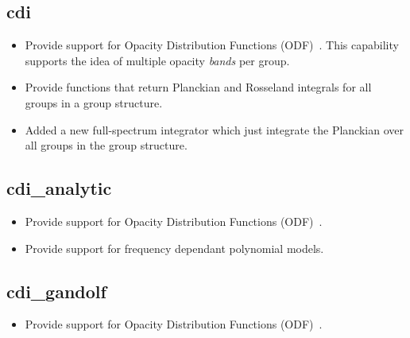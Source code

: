 \documentclass[note]{ResearchNote}
\begin{document}
\subsection{cdi}
\label{changes:cdi}
\begin{itemize}
\item Provide support for Opacity Distribution Functions
  (ODF)~\cite{ccs2:08-52}. This capability supports the idea of
  multiple opacity {\it bands} per group.  
\item Provide functions that return Planckian and Rosseland integrals
  for all groups in a group structure.
\item Added a new full-spectrum integrator which just integrate the
  Planckian over all groups in the group structure.
\end{itemize}

\subsection{cdi\_analytic}
\label{changes:cdi-analytic}
\begin{itemize}
\item Provide support for Opacity Distribution Functions
  (ODF)~\cite{ccs2:08-52}.  
\item Provide support for frequency dependant polynomial models.
\end{itemize}

\subsection{cdi\_gandolf}
\label{changes:cdi-gandolf}
\begin{itemize}
\item Provide support for Opacity Distribution Functions
  (ODF)~\cite{ccs2:08-52,gandolf}.
\end{itemize}
\end{document}
